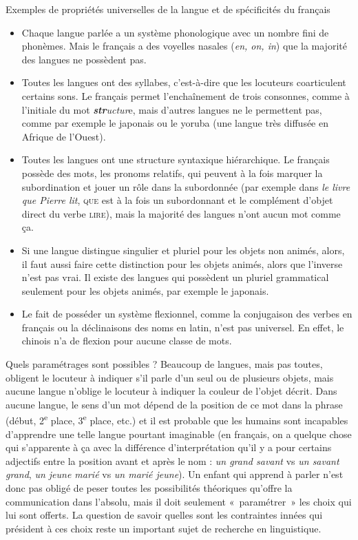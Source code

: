 {    \begin{styleaprofondissementInterTitre}
    Exemples de propriétés universelles de la langue et de spécificités du français
    \end{styleaprofondissementInterTitre}

    \begin{itemize}
    \item Chaque langue parlée a un système phonologique avec un nombre fini de phonèmes. Mais le français a des voyelles nasales (\textit{en, on, in}) que la majorité des langues ne possèdent pas.
    \item Toutes les langues ont des syllabes, c’est-à-dire que les locuteurs coarticulent certains sons. Le français permet l’enchaînement de trois consonnes, comme à l’initiale du mot \textbf{\textit{str}}\textit{uctur}e, mais d’autres langues ne le permettent pas, comme par exemple le japonais ou le yoruba (une langue très diffusée en Afrique de l’Ouest).
    \item Toutes les langues ont une structure syntaxique hiérarchique. Le français possède des mots, les pronoms relatifs, qui peuvent à la fois marquer la subordination et jouer un rôle dans la subordonnée (par exemple dans \textit{le livre que Pierre lit}, \textsc{que} est à la fois un subordonnant et le complément d’objet direct du verbe \textsc{lire}), mais la majorité des langues n’ont aucun mot comme ça.
    \item Si une langue distingue singulier et pluriel pour les objets non animés, alors, il faut aussi faire cette distinction pour les objets animés, alors que l’inverse n’est pas vrai. Il existe des langues qui possèdent un pluriel grammatical seulement pour les objets animés, par exemple le japonais.
    \item Le fait de posséder un système flexionnel, comme la conjugaison des verbes en français ou la déclinaisons des noms en latin, n’est pas universel. En effet, le chinois n’a de flexion pour aucune classe de mots.
    \end{itemize}

    Quels paramétrages sont possibles ? Beaucoup de langues, mais pas toutes, obligent le locuteur à indiquer s’il parle d’un seul ou de plusieurs objets, mais aucune langue n’oblige le locuteur à indiquer la couleur de l’objet décrit. Dans aucune langue, le sens d’un mot dépend de la position de ce mot dans la phrase (début, 2\textsuperscript{e} place, 3\textsuperscript{e} place, etc.) et il est probable que les humains sont incapables d’apprendre une telle langue pourtant imaginable (en français, on a quelque chose qui s’apparente à ça avec la différence d’interprétation qu’il y a pour certains adjectifs entre la position avant et après le nom : \textit{un grand savant} vs \textit{un savant grand}, \textit{un jeune marié} vs \textit{un marié jeune}). Un enfant qui apprend à parler n’est donc pas obligé de peser toutes les possibilités théoriques qu’offre la communication dans l’absolu, mais il doit seulement «~paramétrer~» les choix qui lui sont offerts. La question de savoir quelles sont les contraintes innées qui président à ces choix reste un important sujet de recherche en linguistique.
}
